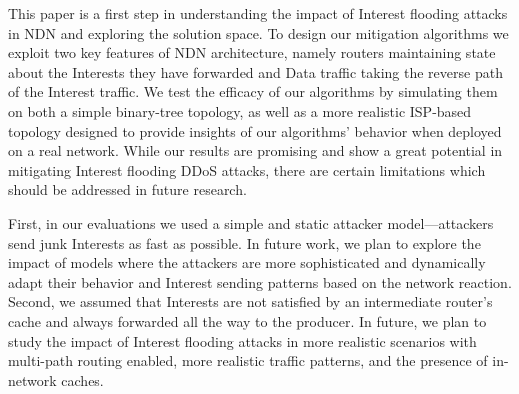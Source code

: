 \documentclass[10pt,conference]{IEEEtran}
\begin{document}
{%

This paper is a first step in understanding the impact of Interest flooding attacks in NDN and exploring the solution space. 
To design our mitigation algorithms we exploit two key features of NDN architecture, namely routers maintaining state about the Interests they have forwarded and Data traffic taking the reverse path of the Interest traffic. 
We test the efficacy of our algorithms by simulating them on both a simple binary-tree topology, %
as well as a more realistic ISP-based topology designed to provide insights of our algorithms' behavior when deployed on a real network. 
While our results are promising and show a great potential in mitigating Interest flooding DDoS attacks, there are certain limitations which should be addressed in future research. 

First, in our evaluations we used a simple and static attacker model---attackers send junk Interests as fast as possible. 
In future work, we plan to explore the impact of models where the attackers are more sophisticated and dynamically adapt their behavior and Interest sending patterns based on the network reaction. 
Second, we assumed that Interests are not satisfied by an intermediate router's cache and always forwarded all the way to the producer.  
In future, we plan to study the impact of Interest flooding attacks in more realistic scenarios with multi-path routing enabled, more realistic traffic patterns, and the presence of in-network caches.



}
\end{document}

